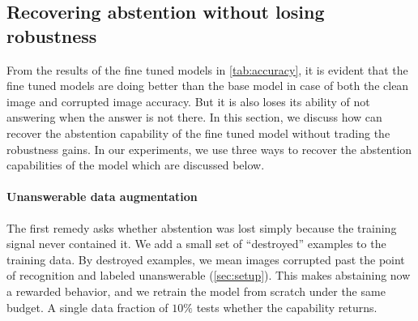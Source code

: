 \documentclass[10pt,twocolumn,letterpaper]{article}
\begin{document}
\subsection{Recovering abstention without losing robustness}
\label{sec:method-probes}
From the results of the fine tuned models in \cref{tab:accuracy}, it is evident that the fine tuned models are doing better than the base model in case of both the clean image and corrupted image accuracy. But it is also loses its ability of not answering when the answer is not there. In this section, we discuss how can recover the abstention capability of the fine tuned model without trading the robustness gains. In our experiments, we use three ways to recover the abstention capabilities of the model which are discussed below.


\paragraph{Unanswerable data augmentation}

The first remedy asks whether abstention was lost simply because the training signal never
contained it. We add a small set of ``destroyed'' examples to the training data. By destroyed examples, we mean images corrupted past the
point of recognition and labeled unanswerable (\cref{sec:setup}). This makes abstaining now a rewarded behavior, and we retrain the model from scratch under the same budget.
A single data fraction of $10\%$ tests whether the capability returns.
\end{document}
